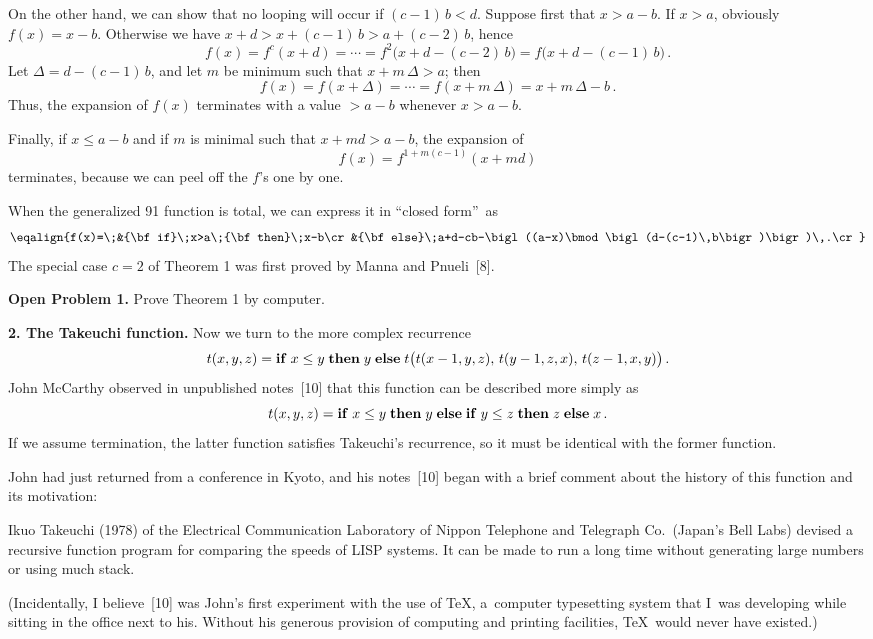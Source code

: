 On the other hand, we can show that no looping will occur if
$(c-1)\,b<d$. Suppose first that $x>a-b$. If $x>a$, obviously
$f(x)=x-b$. Otherwise we have $x+d>x+(c-1)\,b>a+(c-2)\,b$, hence
$$f(x)=f^c(x+d)=\cdots
=f^2\bigl(x+d-(c-2)\,b\bigr)=f\bigl(x+d-(c-1)\,b\bigr)\,.$$
Let $\Delta=d-(c-1)\,b$, and let $m$ be minimum such that
$x+m\,\Delta>a$; then
$$f(x)=f(x+\Delta)=\cdots =f(x+m\,\Delta)=x+m\,\Delta-b\,.$$
Thus, the expansion of $f(x)$ terminates with a value $>a-b$ whenever
$x>a-b$. 

Finally, if $x\leq a-b$ and if $m$ is minimal such that $x+md>a-b$,
the expansion of
$$f(x)=f^{1+m(c-1)}(x+md)$$
terminates, because we can peel off the $f$'s one by one.\quad\pfbox

When the generalized 91 function is total, we can express it in
``closed form''~as
$$\eqalign{f(x)=\;&{\bf if}\;x>a\;{\bf then}\;x-b\cr
&{\bf
else}\;a+d-cb-\bigl((a-x)\bmod\bigl(d-(c-1)\,b\bigr)\bigr)\,.\cr}$$
The special case $c=2$ of Theorem 1 was first proved by Manna and
Pnueli~[8]. 

\medskip\noindent
{\bf Open Problem 1.}\enspace
Prove Theorem 1 by computer.\quad\pfbox

\bigskip\noindent
{\bf 2. The Takeuchi function.}\enspace
Now we turn to the more complex recurrence
$$t(x,y,z)={\bf if}\;x\leq y\;{\bf then}\;y\;{\bf else}\;
t\bigl(t(x-1,y,z),\,t(y-1,z,x),\,t(z-1,x,y)\bigr)\,.$$
John McCarthy observed in unpublished notes~[10]
that this function can be
described more simply as
$$t(x,y,z)={\bf if}\;x\leq y\;{\bf then}\;y\;{\bf else}\;{\bf if}\;
y\leq z\;{\bf then}\; z\;{\bf else}\;x\,.$$
If we assume termination, the latter function satisfies Takeuchi's 
recurrence, so it must be identical with the former function.

John had just returned from a conference in Kyoto, and his notes~[10]
began with a brief comment about the history of this function and its
motivation:

{\narrower\smallskip\noindent
Ikuo Takeuchi (1978) of the Electrical Communication Laboratory of
Nippon Telephone and Telegraph Co.\ (Japan's Bell Labs) devised a
recursive function program for comparing the speeds of LISP systems.
It can be made to run a long time without generating large numbers or
using much stack.
\smallskip}

\noindent
(Incidentally, I believe~[10] was John's first experiment with the use
of \TeX, a~computer typesetting system that I~was developing while
sitting in the office next to his. Without his generous provision of
computing and printing facilities, \TeX\ would never have existed.)

